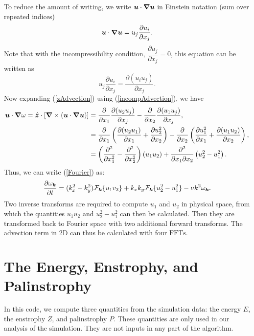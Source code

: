 \documentclass[12pt]{article}
\def\Eq#1{(\ref{#1})}
\begin{document}
To reduce the amount of writing, we write ${\bm u}\cdot\bm\nabla{\bm u}$ in Einstein notation (sum over repeated indices)
$${\bm u}\cdot\bm\nabla{\bm u} =u_j\dfrac{\partial u_i}{\partial x_j}.$$
Note that with the incompressibility condition, $\dfrac{\partial u_j}{\partial x_j} =0$, this equation can be written as
\begin{equation}\label{incompAdvection}
u_j\dfrac{\partial u_i}{\partial x_j} = \dfrac{\partial (u_iu_j)}{\partial x_j}.
\end{equation}
Now expanding \Eq{zAdvection} using \Eq{incompAdvection}, we have
\begin{align*}
{\bm u}\cdot\bm\nabla\omega =\hat{{\bm z}}\cdot \left[\bm\nabla \times \left({\bm u}\cdot\bm\nabla{\bm u} \right)\right]&= \dfrac{\partial }{\partial x_1}\dfrac{\partial (u_2u_j)}{\partial x_j}  - \dfrac{\partial }{\partial x_2}\dfrac{\partial (u_1u_j)}{\partial x_j},\\
&= \dfrac{\partial }{\partial x_1}\left(\dfrac{\partial (u_2u_1)}{\partial x_1}+\dfrac{\partial u_2^2}{\partial x_2}\right)  - \dfrac{\partial }{\partial x_2}\left(\dfrac{\partial u_1^2}{\partial x_1}+\dfrac{\partial (u_1u_2)}{\partial x_2}\right),\\
&= \left(\frac{\partial^2}{\partial x_1^2} - \frac{\partial^2}{\partial x_2^2}\right)(u_1u_2) +\frac{\partial^2}{\partial x_1\partial x_2}\left(u_2^2-u_1^2\right).\\
\end{align*}
Thus, we can write \Eq{Fourier} as:
\begin{equation}\label{evolutionary}
  \frac{\partial\omega_{{\bm k}}}{\partial t} =
  (k_x^2-k_y^2) {\mathcal F}_{\bm k}\{u_1v_2\}+k_xk_y{\mathcal F}_{\bm k}\{u_2^2-u_1^2\} -\nu k^2\omega_{{\bm k}}.
\end{equation}
Two inverse transforms are required to compute $u_1$ and $u_2$ in physical
space, from which the quantities $u_1u_2$ and $u_2^2-u_1^2$ can then be
calculated. Then they are transformed back to Fourier space with two additional
forward transforms. The advection term in 2D can thus be calculated with four $\text{FFTs}$.
\section{The Energy, Enstrophy, and Palinstrophy}
In this code, we compute three quantities from the simulation data: the energy $E$, the enstrophy $Z$, and palinstrophy $P$.  These quantities are only used in our analysis of the simulation. They are not inputs in any part of the algorithm.
\end{document}
